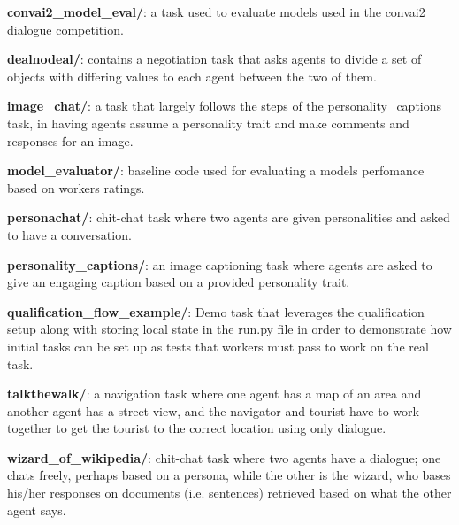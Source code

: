 \begin{DoxyItemize}
\item {\bfseries convai2\+\_\+model\+\_\+eval/}\+: a task used to evaluate models used in the convai2 dialogue competition.
\item {\bfseries dealnodeal/}\+: contains a negotiation task that asks agents to divide a set of objects with differing values to each agent between the two of them.
\item {\bfseries image\+\_\+chat/}\+: a task that largely follows the steps of the {\ttfamily \hyperlink{namespacepersonality__captions}{personality\+\_\+captions}} task, in having agents assume a personality trait and make comments and responses for an image.
\item {\bfseries model\+\_\+evaluator/}\+: baseline code used for evaluating a model\textquotesingle{}s perfomance based on workers\textquotesingle{} ratings.
\item {\bfseries personachat/}\+: chit-\/chat task where two agents are given personalities and asked to have a conversation.
\item {\bfseries personality\+\_\+captions/}\+: an image captioning task where agents are asked to give an engaging caption based on a provided personality trait.
\item {\bfseries qualification\+\_\+flow\+\_\+example/}\+: Demo task that leverages the qualification setup along with storing local state in the {\ttfamily run.\+py} file in order to demonstrate how initial tasks can be set up as \textquotesingle{}tests\textquotesingle{} that workers must pass to work on the real task.
\item {\bfseries talkthewalk/}\+: a navigation task where one agent has a map of an area and another agent has a street view, and the navigator and tourist have to work together to get the tourist to the correct location using only dialogue.
\item {\bfseries wizard\+\_\+of\+\_\+wikipedia/}\+: chit-\/chat task where two agents have a dialogue; one chats freely, perhaps based on a persona, while the other is the \textquotesingle{}wizard\textquotesingle{}, who bases his/her responses on documents (i.\+e. sentences) retrieved based on what the other agent says. 
\end{DoxyItemize}